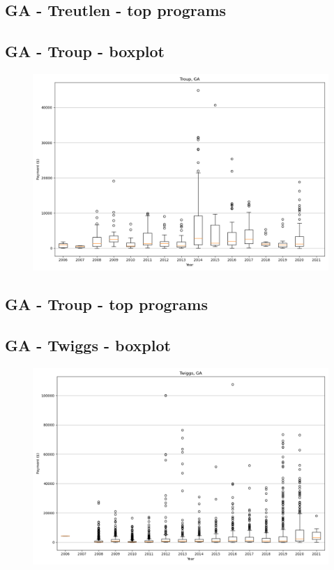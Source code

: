 \subsection*{GA - Treutlen - top programs}

\newpage
\subsection*{GA - Troup - boxplot}
\begin{figure}[h]
\centering
\includegraphics[width=7in]{../output/boxplots/counties/Troup-GA_boxplot.png}
\end{figure}


\subsection*{GA - Troup - top programs}

\newpage
\subsection*{GA - Twiggs - boxplot}
\begin{figure}[h]
\centering
\includegraphics[width=7in]{../output/boxplots/counties/Twiggs-GA_boxplot.png}
\end{figure}


